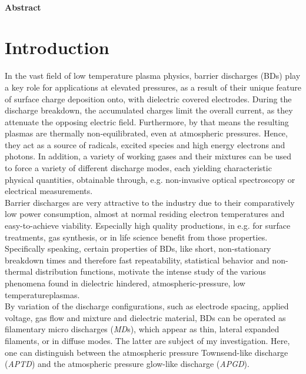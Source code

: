 \documentclass[a4paper,10pt,twoside]{article}
\newcommand{\tilt}[1]{\textit{#1}}
\begin{document}
	\begin{multicols}{2}
		\tableofcontents
	\end{multicols}
	
		\vspace{0.75cm}
	
		\paragraph{Abstract}
		
	\twocolumn

	\section{Introduction}\label{sec:intro}

		In the vast field of low temperature plasma physics, barrier discharges (BDs) play a key role for applications at elevated pressures, as a result of their unique feature of surface charge deposition onto, with dielectric covered electrodes. During the discharge breakdown, the accumulated charges limit the overall current, as they attenuate the opposing electric field. Furthermore, by that means the resulting plasmas are thermally non-equilibrated, even at atmospheric pressures. Hence, they act as a source of radicals, excited species and high energy electrons and photons. In addition, a variety of working gases and their mixtures can be used to force a variety of different discharge modes, each yielding characteristic physical quantities, obtainable through, e.g. non-invasive optical spectroscopy or electrical measurements.\\ 
		Barrier discharges are very attractive to the industry due to their comparatively low power consumption, almost at normal residing electron temperatures and easy-to-achieve viability. Especially high quality productions, in e.g. for surface treatments, gas synthesis, or in life science benefit from those properties.\\
		Specifically speaking, certain properties of BDs, like short, non-stationary breakdown times and therefore fast repeatability, statistical behavior and non-thermal distribution functions, motivate the intense study of the various phenomena found in dielectric hindered, atmospheric-pressure, low temperature\linebreak plasmas.\\
		By variation of the discharge configurations, such as electrode spacing, applied voltage, gas flow and mixture and dielectric material, BDs can be operated as filamentary micro discharges (\tilt{MD}s), which appear as thin, lateral expanded filaments, or in diffuse modes. The latter are subject of my investigation. Here, one can distinguish between the atmospheric pressure Townsend-like discharge (\tilt{APTD}) and the atmospheric pressure glow-like discharge (\tilt{APGD}).\\
\end{document}
